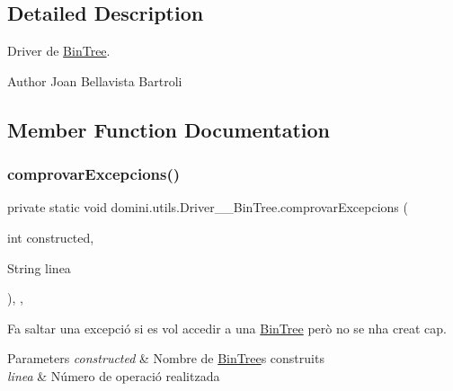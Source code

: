 \subsection{Detailed Description}
Driver de \hyperlink{classdomini_1_1utils_1_1BinTree}{Bin\+Tree}. 

\begin{DoxyAuthor}{Author}
Joan Bellavista Bartroli 
\end{DoxyAuthor}


\subsection{Member Function Documentation}
\mbox{\label{classdomini_1_1utils_1_1Driver____BinTree_a06b6edeb965f3677c7ebb085d512f568}} 
\subsubsection{\texorpdfstring{comprovar\+Excepcions()}{comprovarExcepcions()}}
{\footnotesize\ttfamily private static void domini.\+utils.\+Driver\+\_\+\+\_\+\+Bin\+Tree.\+comprovar\+Excepcions (\begin{DoxyParamCaption}\item[{int}]{constructed,  }\item[{String}]{linea }\end{DoxyParamCaption})\hspace{0.3cm}{\ttfamily [inline]}, {\ttfamily [static]}, {\ttfamily [private]}}



Fa saltar una excepció si es vol accedir a una \hyperlink{classdomini_1_1utils_1_1BinTree}{Bin\+Tree} però no se n\textquotesingle{}ha creat cap. 


\begin{DoxyParams}{Parameters}
{\em constructed} & Nombre de \hyperlink{classdomini_1_1utils_1_1BinTree}{Bin\+Tree}\textquotesingle{}s construits \\
\hline
{\em linea} & Número de operació realitzada \\
\hline
\end{DoxyParams}
\mbox{\label{classdomini_1_1utils_1_1Driver____BinTree_a08875cef02b7a770a105b0b6b976a681}} 
